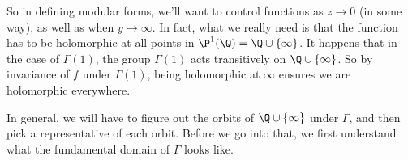 \documentclass[a4paper]{article}
\begin{document}
\begin{eg}
\begin{center}
  \end{center}
\end{eg}
So in defining modular forms, we'll want to control functions as $z \to 0$ (in some way), as well as when $y \to \infty$. In fact, what we really need is that the function has to be holomorphic at all points in $\P^1(\Q) = \Q \cup \{\infty\}$. It happens that in the case of $\Gamma(1)$, the group $\Gamma(1)$ acts transitively on $\Q \cup \{\infty\}$. So by invariance of $f$ under $\Gamma(1)$, being holomorphic at $\infty$ ensures we are holomorphic everywhere.

In general, we will have to figure out the orbits of $\Q \cup \{\infty\}$ under $\Gamma$, and then pick a representative of each orbit. Before we go into that, we first understand what the fundamental domain of $\Gamma$ looks like.
\end{document}
